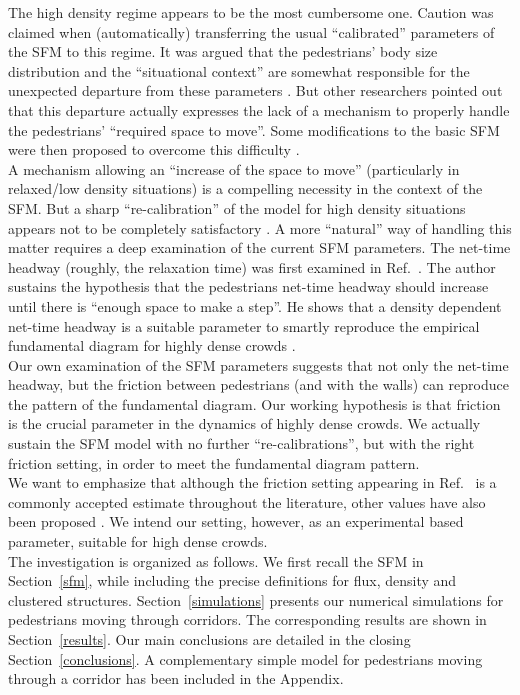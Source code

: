 The high density regime appears to be the most cumbersome one. Caution was 
claimed when (automatically) transferring the usual ``calibrated'' parameters 
of the SFM to this regime. It was argued that the pedestrians' body size 
distribution and the ``situational context'' are somewhat responsible for the 
unexpected departure from these parameters \cite{johansson1,kwak}. But other 
researchers pointed out that this departure actually expresses the lack of a 
mechanism to properly handle the pedestrians' ``required space to move''. Some 
modifications to the basic SFM were then proposed to overcome this difficulty 
\cite{parisi2,seyfried2}. \\

{\color{red} A mechanism allowing an ``increase of the space to move'' (particularly in relaxed/low density situations) is a compelling necessity in the context of the SFM.
But a sharp ``re-calibration'' of the model for high density situations appears not 
to be completely satisfactory \cite{johansson}.} A more ``natural'' way of 
handling this matter requires a deep examination of the current SFM parameters. 
The net-time headway (roughly, the relaxation time) was first examined in 
Ref.~\cite{johansson}. The author sustains the hypothesis that the 
pedestrians net-time headway should increase until there is ``enough space to 
make a step''.  He shows that a density dependent net-time headway is a 
suitable parameter to smartly reproduce the empirical fundamental diagram for 
highly dense crowds \cite{johansson}.  \\ 

Our own examination of the SFM parameters suggests that not only the net-time 
headway, but the friction between pedestrians (and with the walls) can 
reproduce the pattern of the fundamental diagram. Our working hypothesis is 
that friction is the crucial parameter in the dynamics of highly dense crowds. 
We actually sustain the SFM model with no further ``re-calibrations'', but 
with the right friction setting, in order to meet the fundamental diagram 
pattern. \\  

We want to emphasize that although the friction setting appearing in 
Ref.~\cite{Helbing1} is a commonly accepted estimate throughout the  
literature, other values have also been proposed \cite{colombi2017}. We 
intend our setting, however, as an experimental based parameter, suitable for 
high dense crowds. \\

The investigation is organized as follows. We first recall the SFM in 
Section~\ref{sfm}, while including the precise definitions for flux, density 
and clustered structures. Section~\ref{simulations} presents our numerical 
simulations for pedestrians moving through corridors. The corresponding results 
are shown in Section~\ref{results}. Our main conclusions are detailed in the 
closing Section~\ref{conclusions}. A complementary simple model for pedestrians 
moving through a corridor has been included in the Appendix. \\     


